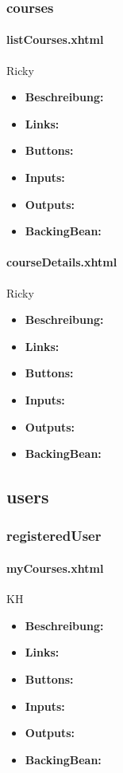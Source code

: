 			\subsubsection{courses}
				
				\paragraph{listCourses.xhtml}
				Ricky
					\begin{itemize}
						\item \textbf{Beschreibung:}
						\item \textbf{Links:}
						\item \textbf{Buttons:}
						\item \textbf{Inputs:}
						\item \textbf{Outputs:}
						\item \textbf{BackingBean:}
					\end{itemize}
				
				\paragraph{courseDetails.xhtml}
				Ricky
					\begin{itemize}
						\item \textbf{Beschreibung:}
						\item \textbf{Links:}
						\item \textbf{Buttons:}
						\item \textbf{Inputs:}
						\item \textbf{Outputs:}
						\item \textbf{BackingBean:}
					\end{itemize}
		
		\subsection{users}
		
			\subsubsection{registeredUser}
				
				\paragraph{myCourses.xhtml}
					KH\\
					\begin{itemize}
						\item \textbf{Beschreibung:}
						\item \textbf{Links:}
						\item \textbf{Buttons:}
						\item \textbf{Inputs:}
						\item \textbf{Outputs:}
						\item \textbf{BackingBean:}
					\end{itemize}
				
